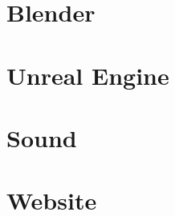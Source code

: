 \documentclass[
    headings=optiontotocandhead,%
    twoside,
    numbers=noenddot,%
    toc=flat, %
    12pt, %
    titlepage, %
    parskip=full, %
    listof=totoc, %
    listof=flat, %
    numbers=noenddot, %
    bibliography=totoc, %
    a4paper,DIV=14,
    BCOR=15mm,
]{scrbook}
\begin{document}

%

\chapter{Blender}

\renewcommand{\kapitelautor}{}



\chapter{Unreal Engine}

\renewcommand{\kapitelautor}{}


\chapter{Sound}

\renewcommand{\kapitelautor}{}



\chapter{Website}

\renewcommand{\kapitelautor}{}





%

%
\end{document}
